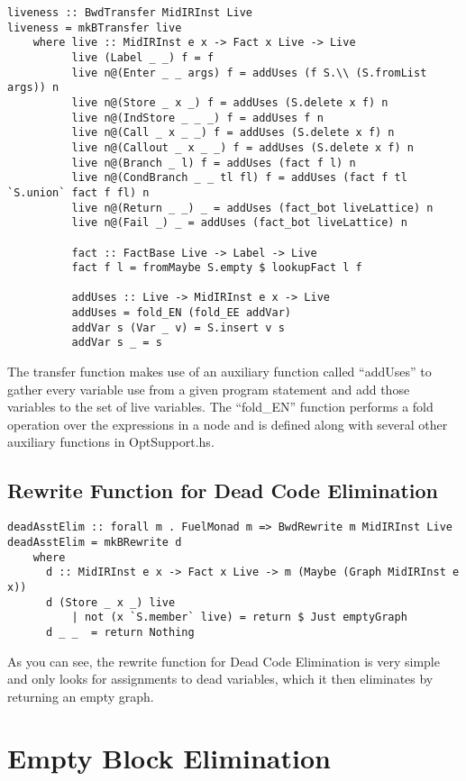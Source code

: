 \documentclass[11pt]{article}
\begin{document}
\begin{verbatim}
liveness :: BwdTransfer MidIRInst Live 
liveness = mkBTransfer live 
    where live :: MidIRInst e x -> Fact x Live -> Live
          live (Label _ _) f = f 
          live n@(Enter _ _ args) f = addUses (f S.\\ (S.fromList args)) n
          live n@(Store _ x _) f = addUses (S.delete x f) n 
          live n@(IndStore _ _ _) f = addUses f n 
          live n@(Call _ x _ _) f = addUses (S.delete x f) n
          live n@(Callout _ x _ _) f = addUses (S.delete x f) n 
          live n@(Branch _ l) f = addUses (fact f l) n 
          live n@(CondBranch _ _ tl fl) f = addUses (fact f tl `S.union` fact f fl) n 
          live n@(Return _ _) _ = addUses (fact_bot liveLattice) n 
          live n@(Fail _) _ = addUses (fact_bot liveLattice) n 

          fact :: FactBase Live -> Label -> Live 
          fact f l = fromMaybe S.empty $ lookupFact l f 

          addUses :: Live -> MidIRInst e x -> Live 
          addUses = fold_EN (fold_EE addVar) 
          addVar s (Var _ v) = S.insert v s 
          addVar s _ = s
\end{verbatim}

The transfer function makes use of an auxiliary function called ``addUses'' to gather every variable use from a given program statement and add those variables to the set of live variables. The ``fold\_EN'' function performs a fold operation over the expressions in a node and is defined along with several other auxiliary functions in OptSupport.hs. 
 
\subsection{Rewrite Function for Dead Code Elimination}
\begin{verbatim}
deadAsstElim :: forall m . FuelMonad m => BwdRewrite m MidIRInst Live 
deadAsstElim = mkBRewrite d 
    where 
      d :: MidIRInst e x -> Fact x Live -> m (Maybe (Graph MidIRInst e x))
      d (Store _ x _) live 
          | not (x `S.member` live) = return $ Just emptyGraph
      d _ _  = return Nothing
\end{verbatim}

As you can see, the rewrite function for Dead Code Elimination is very simple and only looks for assignments to dead variables, which it then eliminates by returning an empty graph. 

\section {Empty Block Elimination}
\label{sec:blockelim}
\end{document}

